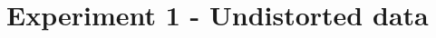 
\section{Experiment 1 - Undistorted data}

\setlength{\tabcolsep}{1.4pt}
\setlength{\extrarowheight}{6.0pt}

